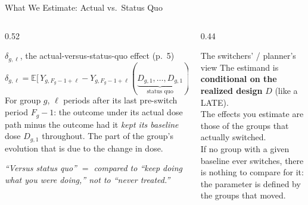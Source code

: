 \documentclass[main.tex]{subfiles}
\begin{document}
\begin{frame}{What We Estimate: Actual vs.\ Status Quo}

  \begin{columns}[T]
    \begin{column}{0.52\textwidth}
      \begin{defbox}{$\delta_{g,\ell}$, the actual-versus-status-quo effect (p.~5)}
        \footnotesize
        \[
          \delta_{g,\ell} = \mathbb{E}\big[\, Y_{g,F_g-1+\ell}
            - Y_{g,F_g-1+\ell}(\underbrace{D_{g,1},\ldots,D_{g,1}}_{\text{status quo}})
            \mid D \,\big]
        \]
        For group $g$, $\ell$ periods after its last pre-switch period $F_g-1$: the
        outcome under its actual dose path minus the outcome had it
        \emph{kept its baseline} dose $D_{g,1}$ throughout. The part of the
        group's evolution that is due to the change in dose.
      \end{defbox}

      \smallskip
      \textit{\small ``Versus status quo'' $=$ compared to ``keep doing
      what you were doing,'' not to ``never treated.''}
    \end{column}
    \begin{column}{0.44\textwidth}
      \begin{alertblock}{The switchers' / planner's view}
        \footnotesize
        The estimand is \textbf{conditional on the realized design}
        $D$ (like a LATE).\\[4pt]
        The effects you estimate are those of the groups that actually
        switched.\\[4pt]
        If no group with a given baseline ever switches, there is nothing to
        compare for it: the parameter is defined by the groups that moved.
      \end{alertblock}
    \end{column}
  \end{columns}

\end{frame}
\end{document}
